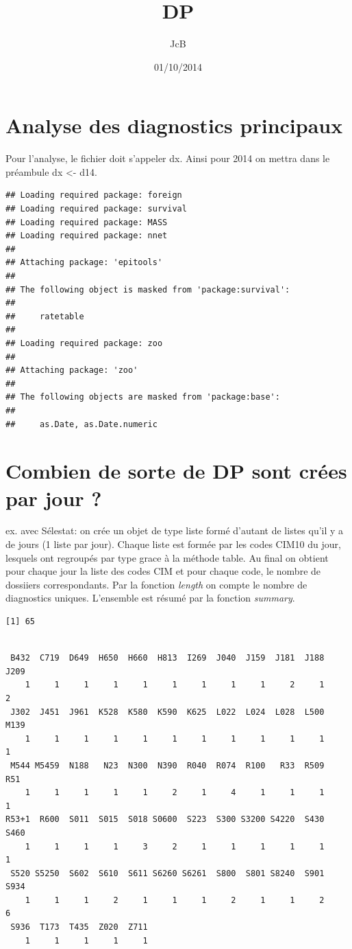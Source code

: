 \documentclass[]{article}
\title{DP}
\author{JcB}
\date{01/10/2014}
\begin{document}
\maketitle


{
\hypersetup{linkcolor=black}
\setcounter{tocdepth}{2}
\tableofcontents
}
\section{Analyse des diagnostics
principaux}\label{analyse-des-diagnostics-principaux}

Pour l'analyse, le fichier doit s'appeler dx. Ainsi pour 2014 on mettra
dans le préambule dx \textless{}- d14.

\begin{verbatim}
## Loading required package: foreign
## Loading required package: survival
## Loading required package: MASS
## Loading required package: nnet
## 
## Attaching package: 'epitools'
## 
## The following object is masked from 'package:survival':
## 
##     ratetable
## 
## Loading required package: zoo
## 
## Attaching package: 'zoo'
## 
## The following objects are masked from 'package:base':
## 
##     as.Date, as.Date.numeric
\end{verbatim}

\section{Combien de sorte de DP sont crées par jour
?}\label{combien-de-sorte-de-dp-sont-crees-par-jour}

ex. avec Sélestat: on crée un objet de type liste formé d'autant de
listes qu'il y a de jours (1 liste par jour). Chaque liste est formée
par les codes CIM10 du jour, lesquels ont regroupés par type grace à la
méthode table. Au final on obtient pour chaque jour la liste des codes
CIM et pour chaque code, le nombre de dossiiers correspondants. Par la
fonction \emph{length} on compte le nombre de diagnostics uniques.
L'ensemble est résumé par la fonction \emph{summary}.

\begin{verbatim}
[1] 65
\end{verbatim}

\begin{verbatim}

 B432  C719  D649  H650  H660  H813  I269  J040  J159  J181  J188  J209 
    1     1     1     1     1     1     1     1     1     2     1     2 
 J302  J451  J961  K528  K580  K590  K625  L022  L024  L028  L500  M139 
    1     1     1     1     1     1     1     1     1     1     1     1 
 M544 M5459  N188   N23  N300  N390  R040  R074  R100   R33  R509   R51 
    1     1     1     1     1     2     1     4     1     1     1     1 
R53+1  R600  S011  S015  S018 S0600  S223  S300 S3200 S4220  S430  S460 
    1     1     1     1     3     2     1     1     1     1     1     1 
 S520 S5250  S602  S610  S611 S6260 S6261  S800  S801 S8240  S901  S934 
    1     1     1     2     1     1     1     2     1     1     2     6 
 S936  T173  T435  Z020  Z711 
    1     1     1     1     1 
\end{verbatim}
\end{document}
